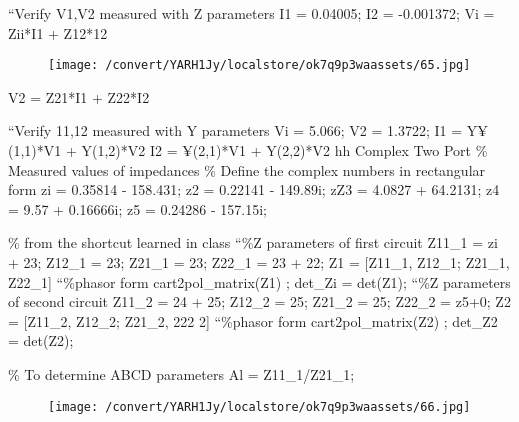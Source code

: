 \documentclass[12pt]{report}
\begin{document}
\vspace{10pt}

    “Verify V1,V2 measured with Z parameters  I1 = 0.04005;   I2 = -0.001372;   Vi = Zii*I1 + Z12*12 

\vspace{10pt}

\begin{figure}[h]

\texttt{[image: /convert/YARH1Jy/localstore/ok7q9p3waassets/65.jpg]}

\centering

\end{figure}

\par

\vspace{10pt}

    V2 = Z21*I1 + Z22*I2 

\vspace{10pt}

    “Verify 11,12 measured with Y parameters   Vi = 5.066;   V2 = 1.3722;   I1 = Y¥(1,1)*V1 + Y(1,2)*V2   I2 = ¥(2,1)*V1 + Y(2,2)*V2   hh Complex Two Port   \% Measured values of impedances   \% Define the complex numbers in rectangular form  zi = 0.35814 - 158.431;    z2 = 0.22141 - 149.89i;  zZ3 = 4.0827 + 64.2131;  z4 = 9.57 + 0.16666i;    z5 = 0.24286 - 157.15i; 

\vspace{10pt}

    \% from the shortcut learned in class  “\%Z parameters of first circuit  Z11\_1 = zi + 23;   Z12\_1 = 23;   Z21\_1 = 23;   Z22\_1 = 23 + 22;   Z1 = [Z11\_1, Z12\_1; Z21\_1, Z22\_1]  “\%phasor form   cart2pol\_matrix(Z1) ;   det\_Zi = det(Z1);   “\%Z parameters of second circuit    Z11\_2 = 24 + 25;  Z12\_2 = 25;  Z21\_2 = 25;  Z22\_2 = z5+0;    Z2 = [Z11\_2, Z12\_2; Z21\_2, 222 2]  “\%phasor form   cart2pol\_matrix(Z2) ;   det\_Z2 = det(Z2); 

\vspace{10pt}

    \% To determine ABCD parameters  Al = Z11\_1/Z21\_1; 

\vspace{10pt}

\begin{figure}[h]

\texttt{[image: /convert/YARH1Jy/localstore/ok7q9p3waassets/66.jpg]}

\centering

\end{figure}
\end{document}
